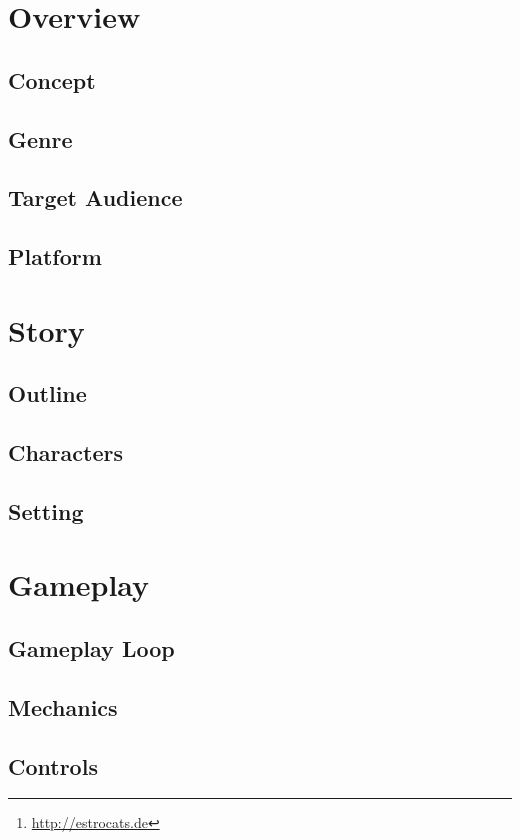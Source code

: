 \documentclass[pdftex,12pt,a4paper,ngerman,dvipsnames]{scrreport}
\title{\worktitle}
\subtitle{An Estrocats\footnote{\url{http://estrocats.de}} game}
\author{\authors}
\begin{document}
\pagestyle{empty}
\maketitle
\pagestyle{empty} \cleardoublepage
\tableofcontents
\cleardoublepage 
{}
\pagestyle{fancy}
\chapter{Overview}
\section{Concept}
\section{Genre}
\section{Target Audience}
\section{Platform}
\chapter{Story}
\section{Outline}
\section{Characters}
\section{Setting}
\chapter{Gameplay}
\section{Gameplay Loop}
\section{Mechanics}
\section{Controls}
\end{document}
